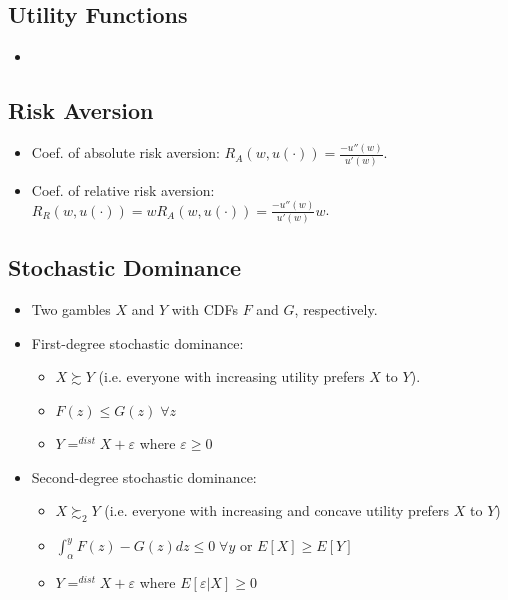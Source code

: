 \documentclass{article}
\begin{document}
\subsection*{Utility Functions}

\begin{itemize}

\item 

\end{itemize}

\subsection*{Risk Aversion}

\begin{itemize}

\item Coef. of absolute risk aversion: $R_A(w, u(\cdot)) = \frac{-u''(w)}{u'(w)}$.

\item Coef. of relative risk aversion: $R_R(w, u(\cdot)) = wR_A(w, u(\cdot)) = \frac{-u''(w)}{u'(w)}w$.

\end{itemize}

\subsection*{Stochastic Dominance}

\begin{itemize}

\item Two gambles $X$ and $Y$ with CDFs $F$ and $G$, respectively.

\item First-degree stochastic dominance:

\begin{itemize}

\item $X \succsim Y$ (i.e. everyone with increasing utility prefers $X$ to $Y$).

\item $F(z) \le G(z) \; \forall z$

\item $Y =^{dist} X + \varepsilon$ where $\varepsilon \ge 0$

\end{itemize}

\item Second-degree stochastic dominance:

\begin{itemize}

\item $X \succsim_2 Y$ (i.e. everyone with increasing and concave utility prefers $X$ to $Y$)

\item $\int_\alpha^y F(z) - G(z)dz \le 0 \; \forall y$ or $E[X] \ge E[Y]$

\item $Y =^{dist} X + \varepsilon$ where $E[\varepsilon|X] \ge 0$

\end{itemize}

\end{itemize}
\end{document}
